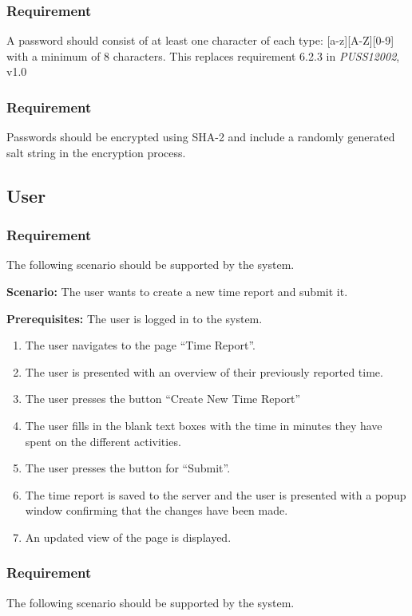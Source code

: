 \documentclass{article}
\begin{document}
\subsubsection{Requirement}
A password should consist of at least one character of each type: [a-z][A-Z][0-9] with a minimum of 8 characters. This replaces requirement 6.2.3 in \emph{PUSS12002}, v1.0

\subsubsection{Requirement}
Passwords should be encrypted using SHA-2 and include a randomly generated salt string in the encryption process.

\subsection{User}

\subsubsection{Requirement}
The following scenario should be supported by the system.

\textbf{Scenario:} The user wants to create a new time report and submit it. 

\textbf{Prerequisites:} The user is logged in to the system.

\begin{enumerate}

\item The user navigates to the page “Time Report”. 
\item The user is presented with an overview of their previously reported time. 
\item The user presses the button “Create New Time Report”
\item The user fills in the blank text boxes with the time in minutes they have spent on the different activities.
\item The user presses the button for “Submit”.
\item The time report is saved to the server and the user is presented with a popup window confirming that the changes have been made.
\item An updated view of the page is displayed.
\end{enumerate}

\subsubsection{Requirement}
The following scenario should be supported by the system.
\end{document}
